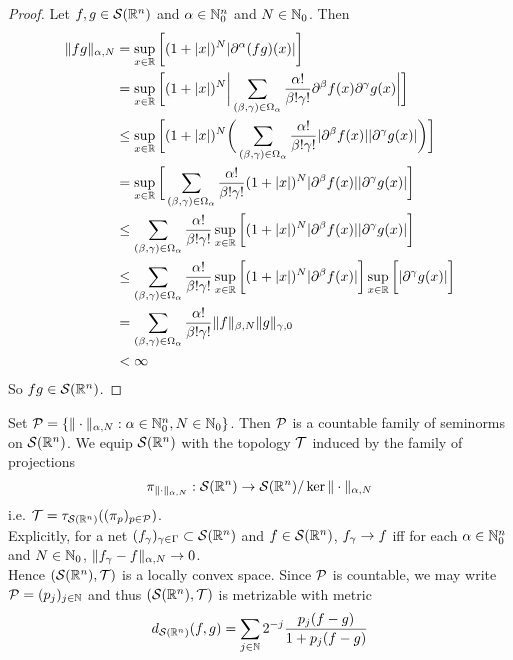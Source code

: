 \documentclass{book}
\begin{document}
	\begin{proof}
		Let $f,g \in \mathcal{S}(\mathbb{R}^n)$ and $\alpha \in \mathbb{N}_0^n$ and $N \in  \mathbb{N}_0$. Then 
		\begin{align*}
			\|fg\|_{\alpha, N}
			& = \sup_{x \in \mathbb{R}} \bigg[ (1 + |x|)^N|\partial^{\alpha}(fg)(x)| \bigg] \\
			& = \sup_{x \in \mathbb{R}} \bigg[ (1 + |x|)^N \bigg | \sum\limits_{(\beta, \gamma) \in \Omega_{\alpha}} \frac{\alpha!}{\beta! \gamma!}\partial^{\beta}f (x) \partial^{\gamma}g (x) \bigg|  \bigg] \\
			& \leq \sup_{x \in \mathbb{R}} \bigg[ (1 + |x|)^N \bigg(\sum\limits_{(\beta, \gamma) \in \Omega_{\alpha}} \frac{\alpha!}{\beta! \gamma!}|\partial^{\beta}f (x)| |\partial^{\gamma}g (x)| \bigg) \bigg] \\
			& = \sup_{x \in \mathbb{R}} \bigg[   \sum\limits_{(\beta, \gamma) \in \Omega_{\alpha}} \frac{\alpha!}{\beta! \gamma!} (1 + |x|)^N|\partial^{\beta}f(x)| |\partial^{\gamma}g (x)| \bigg] \\
			& \leq \sum\limits_{(\beta, \gamma) \in \Omega_{\alpha}} \frac{\alpha!}{\beta! \gamma!} \sup_{x \in \mathbb{R}} \bigg[ (1 + |x|)^N|\partial^{\beta}f(x)| |\partial^{\gamma}g (x)| \bigg] \\
			& \leq \sum\limits_{(\beta, \gamma) \in \Omega_{\alpha}} \frac{\alpha!}{\beta! \gamma!} \sup_{x \in \mathbb{R}} \bigg[ (1 + |x|)^N|\partial^{\beta}f(x)| \bigg]  \sup_{x \in \mathbb{R}} \bigg[|\partial^{\gamma}g (x) | \bigg] \\
			& = \sum\limits_{(\beta, \gamma) \in \Omega_{\alpha}} \frac{\alpha!}{\beta! \gamma!}  \|f\|_{\beta, N} \|g\|_{\gamma, 0} \\
			& < \infty
		\end{align*} 
		So $fg \in \mathcal{S}(\mathbb{R}^n)$.
	\end{proof}

	\begin{defn}
		Set $\mathcal{P} = \{\|\cdot\|_{\alpha, N}: \alpha \in \mathbb{N}_0^n, N \in \mathbb{N}_0 \}$. Then $\mathcal{P}$ is a countable family of seminorms on $\mathcal{S}(\mathbb{R}^n)$. We equip $\mathcal{S}(\mathbb{R}^n)$ with the topology $\mathcal{T}$ induced by the family of projections $$\pi_{\| \cdot \|_{\alpha,N}}: \mathcal{S}(\mathbb{R}^n) \rightarrow \mathcal{S}(\mathbb{R}^n) / \ker \|\cdot\|_{\alpha,N} $$ 
		i.e. $\mathcal{T} = \tau_{\mathcal{S}(\mathbb{R}^n)}((\pi_{p})_{p \in \mathcal{P}})$.  \\
		Explicitly, for a net $(f_{\gamma})_{\gamma \in \Gamma} \subset \mathcal{S}(\mathbb{R}^n)$ and $f \in \mathcal{S}(\mathbb{R}^n)$, $f_{\gamma} \rightarrow f$ iff for each $\alpha \in \mathbb{N}_0^n$ and $N \in  \mathbb{N}_0$, $\|f_{\gamma} - f\|_{\alpha, N} \rightarrow 0$. \\
		Hence $(\mathcal{S}(\mathbb{R}^n), \mathcal{T})$ is a locally convex space. Since $\mathcal{P}$ is countable, we may write $\mathcal{P} = (p_j)_{j \in \mathbb{N}}$ and thus $(\mathcal{S}(\mathbb{R}^n), \mathcal{T})$ is metrizable with metric
		$$d_{\mathcal{S}(\mathbb{R}^n)}(f,g) = \sum_{j \in \mathbb{N}} 2^{-j} \frac{p_j(f-g)}{1 + p_j(f-g)}$$
	\end{defn}
\end{document}
